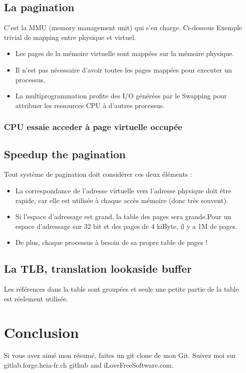 \subsection{La pagination}
C'est la MMU (memory management unit) qui s'en charge. 
Ci-dessous Exemple trivial de mapping entre physique et virtuel.
\begin{itemize}
    \item Les pages de la mémoire virtuelle sont mappées sur la mémoire physique.
    \item Il n'est pas nécessaire d'avoir toutes les pages mappées pour executer un processus.
    \item La multiprogrammation profite des I/O générées par le Swapping pour attribuer les ressources CPU à d'autres processus.
\end{itemize}

\subsubsection{CPU essaie acceder à page virtuelle occupée}

\subsection{Speedup the pagination}
Tout système de pagination doit considérer ces deux éléments :
\begin{itemize}
    \item La correspondance de l’adresse virtuelle vers l’adresse physique doit être rapide, car elle est utilisée à chaque accès mémoire (donc très souvent).
    \item Si l’espace d’adressage est grand, la table des pages sera grande.Pour un espace d’adressage sur 32 bit et des pages de 4 kiByte, il y a 1M de pages.
    \item De plus, chaque processus à besoin de sa propre table de pages !
\end{itemize}

\subsection{La TLB, translation lookaside buffer}
Les références dans la table sont groupées et seule une petite partie de la table est réelement utilisée.


\section{Conclusion}
Si vous avez aimé mon résumé, faites un git clone de mon Git. Suivez moi sur gitlab.forge.heia-fr.ch github and iLoveFreeSoftware.com.


